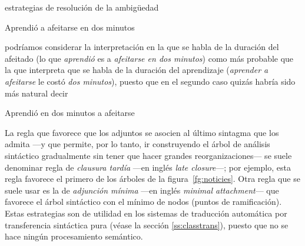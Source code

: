 \begin{persabermes}{estrategias de resolución de la ambigüedad}
\begin{exemple} Aprendió a afeitarse en dos minutos \end{exemple} podríamos considerar la interpretación en la que se habla de la duración del afeitado (lo que \emph{aprendió} es a \emph{afeitarse en dos minutos}) como más probable que la que interpreta que se habla de la duración del aprendizaje (\emph{aprender a afeitarse} le costó \emph{dos minutos}), puesto que en el segundo caso quizás habría sido más natural decir \begin{exemple} Aprendió en dos minutos a afeitarse \end{exemple} La regla que favorece que los adjuntos se asocien al último sintagma que los admita ---y que permite, por lo tanto, ir construyendo el árbol de análisis sintáctico gradualmente sin tener que hacer grandes reorganizaciones--- se suele denominar regla de \emph{clausura tardía} ---en inglés \emph{late closure}---; por ejemplo, esta regla favorece el primero de los árboles de la figura~\ref{fg:noticies}. Otra regla que se suele usar es la de \emph{adjunción mínima} ---en inglés \emph{minimal attachment}--- que favorece el árbol sintáctico con el mínimo de nodos (puntos de ramificación). Estas estrategias son de utilidad en los sistemas de traducción automática por transferencia sintáctica pura (véase la sección \ref{ss:classtrans}), puesto que no se hace ningún procesamiento semántico. 


\end{persabermes}
